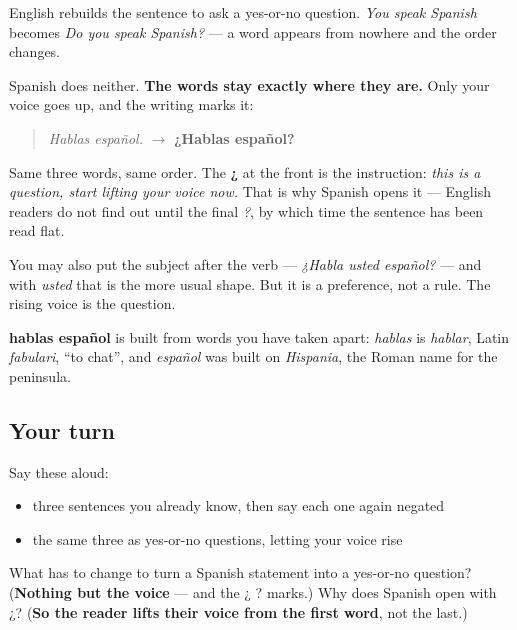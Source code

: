 \begin{grammarlens}[title={Grammar lens: the yes-or-no question — and why Spanish barely has to do anything}]
English rebuilds the sentence to ask a yes-or-no question. \emph{You speak Spanish} becomes \emph{Do you speak Spanish?} — a word appears from nowhere and the order changes.

Spanish does neither. \textbf{The words stay exactly where they are.} Only your voice goes up, and the writing marks it:

\begin{quote}
\emph{Hablas español.}  $\to$  \textbf{¿Hablas español?}
\end{quote}

Same three words, same order. The \textbf{¿} at the front is the instruction: \emph{this is a question, start lifting your voice now.} That is why Spanish opens it — English readers do not find out until the final \emph{?}, by which time the sentence has been read flat.

You may also put the subject after the verb — \emph{¿Habla usted español?} — and with \emph{usted} that is the more usual shape. But it is a preference, not a rule. The rising voice is the question.
\end{grammarlens}

\begin{cousinweb}
\textbf{hablas español} is built from words you have taken apart: \emph{hablas} is \emph{hablar}, Latin \emph{fabulari}, \textquotedblleft{}to chat\textquotedblright{}, and \emph{español} was built on \emph{Hispania}, the Roman name for the peninsula.
\end{cousinweb}

\subsection*{Your turn}
Say these aloud:

\begin{itemize}
\raggedright
  \item three sentences you already know, then say each one again negated
  \item the same three as yes-or-no questions, letting your voice rise
\end{itemize}

\begin{tcolorbox}[breakable,colback=teal!4,colframe=teal!35!black,title={Before you move on}]
What has to change to turn a Spanish statement into a yes-or-no question? (\textbf{Nothing but the voice} — and the ¿ ? marks.) Why does Spanish open with ¿? (\textbf{So the reader lifts their voice from the first word}, not the last.)
\end{tcolorbox}
